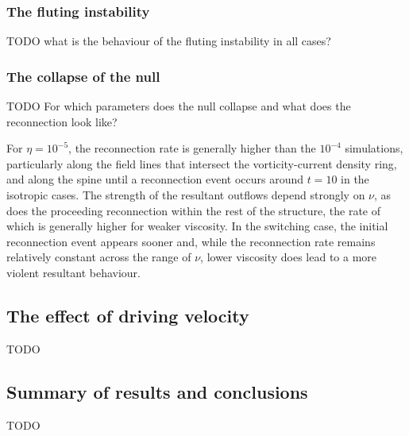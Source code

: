 \subsubsection{The fluting instability}

TODO what is the behaviour of the fluting instability in all cases?

\subsubsection{The collapse of the null}

TODO For which parameters does the null collapse and what does the reconnection look like?

For $\eta=10^{-5}$, the reconnection rate is generally higher than the $10^{-4}$ simulations, particularly along the field lines that intersect the vorticity-current density ring, and along the spine until a reconnection event occurs around $t=10$ in the isotropic cases. The strength of the resultant outflows depend strongly on $\nu$, as does the proceeding reconnection within the rest of the structure, the rate of which is generally higher for weaker viscosity. In the switching case, the initial reconnection event appears sooner and, while the reconnection rate remains relatively constant across the range of $\nu$, lower viscosity does lead to a more violent resultant behaviour.

\subsection{The effect of driving velocity}

TODO

\subsection{Summary of results and conclusions}

TODO
